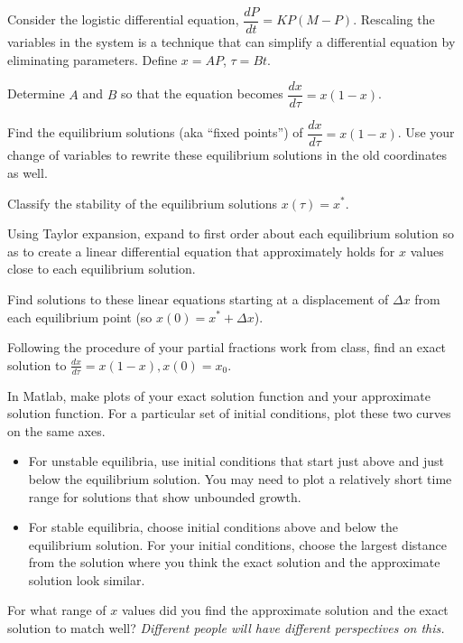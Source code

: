 \documentclass[12pt,letterpaper,noanswers]{exam}
\begin{document}
\begin{questions}
\question Consider the logistic differential equation, $\dfrac{dP}{dt} = KP(M-P)$.  Rescaling the variables in the system is a technique that can simplify a differential equation by eliminating parameters.  Define $x = AP$, $\tau = Bt$.
\begin{parts}
\item   Determine $A$ and $B$ so that the equation becomes $\dfrac{dx}{d\tau} = x(1-x)$.
\item Find the equilibrium solutions (aka ``fixed points'') of $\dfrac{dx}{d\tau} = x(1-x)$.  Use your change of variables to rewrite these equilibrium solutions in the old coordinates as well.
\item Classify the stability of the equilibrium solutions $x(\tau) = x^*$.
\item Using Taylor expansion, expand to first order about each equilibrium solution so as to create a linear differential equation that approximately holds for $x$ values close to each equilibrium solution.
\item Find solutions to these linear equations starting at a displacement of $\Delta x$ from each equilibrium point (so $x(0) = x^* + \Delta x$).
\item Following the procedure of your partial fractions work from class, find an exact solution to $\frac{dx}{d\tau} = x(1-x), x(0) = x_0$.
\item In Matlab, make plots of your exact solution function and your approximate solution function.  For a particular set of initial conditions, plot these two curves on the same axes.
\begin{itemize}
    \item For unstable equilibria, use initial conditions that start just above and just below the equilibrium solution.  You may need to plot a relatively short time range for solutions that show unbounded growth.
    \item For stable equilibria, choose initial conditions above and below the equilibrium solution.  For your initial conditions, choose the largest distance from the solution where you think the exact solution and the approximate solution look similar.
\end{itemize}

\item For what range of $x$ values did you find the approximate solution and the exact solution to match well?  \emph{Different people will have different perspectives on this.}

\end{parts}


\end{questions}
\end{document}
